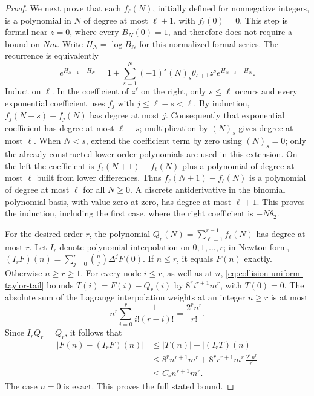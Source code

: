 \documentclass[11pt]{article}
\theoremstyle{definition}
\begin{document}
\begin{proof}
We next prove that each $f_\ell(N)$, initially defined for
nonnegative integers, is a polynomial in $N$ of degree at most
$\ell+1$, with $f_\ell(0)=0$.
This step is formal near $z=0$, where every $B_N(0)=1$,
and therefore does not require a bound on $Nm$.
Write $H_N=\log B_N$ for this normalized formal series.
The recurrence is equivalently
\begin{equation}
 e^{H_{N+1}-H_N}
  =1+\sum_{s=1}^N(-1)^s(N)_s\theta_{s+1}z^s
                          e^{H_{N-s}-H_N}.
 \label{eq:collision-log-degree-recurrence}
\end{equation}
Induct on $\ell$.
In the coefficient of $z^\ell$ on the right, only $s\le\ell$
occurs and every exponential coefficient uses $f_j$ with
$j\le\ell-s<\ell$.
By induction, $f_j(N-s)-f_j(N)$ has degree at most $j$.
Consequently that exponential coefficient has degree at most
$\ell-s$; multiplication by $(N)_s$ gives degree at most $\ell$.
When $N<s$, extend the coefficient term by zero using
$(N)_s=0$; only the already constructed lower-order
polynomials are used in this extension.
On the left the coefficient is
$f_\ell(N+1)-f_\ell(N)$ plus a polynomial of degree at most
$\ell$ built from lower differences.
Thus $f_\ell(N+1)-f_\ell(N)$ is a polynomial of degree at most
$\ell$ for all $N\ge0$.
A discrete antiderivative in the binomial polynomial basis,
with value zero at zero, has degree at most $\ell+1$.
This proves the induction, including the first case, where the
right coefficient is $-N\theta_2$.

For the desired order $r$, the polynomial
$Q_r(N)=\sum_{\ell=1}^{r-1}f_\ell(N)$ has degree at most $r$.
Let $I_r$ denote polynomial interpolation on $0,1,\ldots,r$;
in Newton form,
$(I_rF)(n)=\sum_{j=0}^r\binom nj\Delta^jF(0)$.
If $n\le r$, it equals $F(n)$ exactly.
Otherwise $n\ge r\ge1$.
For every node $i\le r$, as well as at $n$,
\eqref{eq:collision-uniform-taylor-tail} bounds
$T(i)=F(i)-Q_r(i)$ by $8^r i^{r+1}m^r$, with $T(0)=0$.
The absolute sum of the Lagrange interpolation weights at
an integer $n\ge r$ is at most
\[
 n^r\sum_{i=0}^r\frac1{i!(r-i)!}
                   =\frac{2^r n^r}{r!}.
\]
Since $I_rQ_r=Q_r$, it follows that
\[
 \begin{aligned}
 |F(n)-(I_rF)(n)|
 &\le |T(n)|+|(I_rT)(n)|\\
 &\le8^r n^{r+1}m^r
       +8^r r^{r+1}m^r\,\frac{2^r n^r}{r!}\\
 &\le C_r n^{r+1}m^r .
 \end{aligned}
\]
The case $n=0$ is exact.  This proves the full stated bound.
\end{proof}
\end{document}
